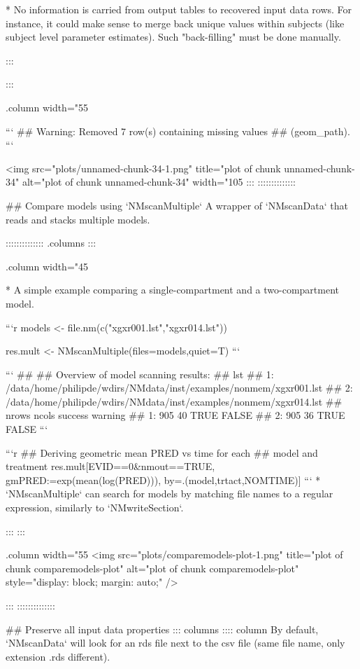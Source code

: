 {{{* No information is carried from output tables to recovered input data
rows. For instance, it could make sense to merge back unique values
within subjects (like subject level parameter estimates). Such
"back-filling" must be done manually.

:::


::: {.column width="55%


```
## Warning: Removed 7 row(s) containing missing values
## (geom_path).
```

<img src="plots/unnamed-chunk-34-1.png" title="plot of chunk unnamed-chunk-34" alt="plot of chunk unnamed-chunk-34" width="105%
:::
::::::::::::::

## Compare models using `NMscanMultiple`
A wrapper of `NMscanData` that reads and stacks multiple models.

:::::::::::::: {.columns}
::: {.column width="45%
\footnotesize



* A simple example comparing a single-compartment and a two-compartment model.

```r
models <- file.nm(c("xgxr001.lst","xgxr014.lst"))

res.mult <- NMscanMultiple(files=models,quiet=T)
```

```
## 
## Overview of model scanning results:
##                                                                  lst
## 1: /data/home/philipde/wdirs/NMdata/inst/examples/nonmem/xgxr001.lst
## 2: /data/home/philipde/wdirs/NMdata/inst/examples/nonmem/xgxr014.lst
##    nrows ncols success warning
## 1:   905    40    TRUE   FALSE
## 2:   905    36    TRUE   FALSE
```

```r
## Deriving geometric mean PRED vs time for each
## model and treatment
res.mult[EVID==0&nmout==TRUE,
         gmPRED:=exp(mean(log(PRED))),
         by=.(model,trtact,NOMTIME)]
```
* `NMscanMultiple` can search for models by matching file names to a regular expression, similarly to `NMwriteSection`. 

:::
::: {.column width="55%
\normalsize
<img src="plots/comparemodels-plot-1.png" title="plot of chunk comparemodels-plot" alt="plot of chunk comparemodels-plot" style="display: block; margin: auto;" />

:::
::::::::::::::

 
## Preserve all input data properties
::: columns
:::: column
By default, `NMscanData` will look for an rds file next to the csv file (same file name, only extension .rds different). 

}}}}}}
